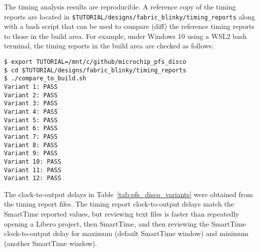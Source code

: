 \clearpage
The timing analysis results are reproducible. A reference copy of the
timing reports are located in
\verb+$TUTORIAL/designs/fabric_blinky/timing_reports+ %
along with a bash script that can be used to compare (diff) the
reference timing reports to those in the build area.
%
For example, under Windows 10 using a WSL2 bash terminal, the timing
reports in the build area are checked as follows:
%
\begin{verbatim}
$ export TUTORIAL=/mnt/c/github/microchip_pfs_disco
$ cd $TUTORIAL/designs/fabric_blinky/timing_reports
$ ./compare_to_build.sh
Variant 1: PASS
Variant 2: PASS
Variant 3: PASS
Variant 4: PASS
Variant 5: PASS
Variant 6: PASS
Variant 7: PASS
Variant 8: PASS
Variant 9: PASS
Variant 10: PASS
Variant 11: PASS
Variant 12: PASS
\end{verbatim}
%
The clock-to-output delays in Table~\ref{tab:pfs_disco_variants} were
obtained from the timing report files. The timing report clock-to-output
delays match the SmartTime reported values, but reviewing text files is
faster than repeatedly opening a Libero project, then SmartTime, and then
reviewing the SmartTime clock-to-output delay for maximum (default SmartTime
window) and minimum (another SmartTime window).

